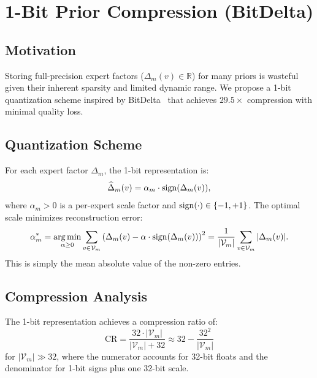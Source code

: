 \section{1-Bit Prior Compression (BitDelta)}

\label{sec:bitdelta}

\subsection{Motivation}

Storing full-precision expert factors ($\Delta_m(v) \in \mathbb{R}$) for many
priors is wasteful given their inherent sparsity and limited dynamic range. We
propose a 1-bit quantization scheme inspired by
BitDelta~\cite{liu2024bitdelta} that achieves $29.5\times$ compression with
minimal quality loss.

\subsection{Quantization Scheme}

For each expert factor $\Delta_m$, the 1-bit representation is:
\begin{equation}
    \widehat{\Delta}_m(v) = \alpha_m \cdot \operatorname{sign}(\Delta_m(v)),
    \label{eq:1bit}
\end{equation}
where $\alpha_m > 0$ is a per-expert scale factor and $\operatorname{sign}(\cdot) \in \{-1, +1\}$.
The optimal scale minimizes reconstruction error:
\begin{equation}
    \alpha_m^* = \operatorname*{arg\,min}_{\alpha \geq 0} \sum_{v \in \mathcal{V}_m}
    \left(\Delta_m(v) - \alpha \cdot \operatorname{sign}(\Delta_m(v))\right)^2
    = \frac{1}{|\mathcal{V}_m|} \sum_{v \in \mathcal{V}_m} |\Delta_m(v)|.
\end{equation}
This is simply the mean absolute value of the non-zero entries.

\subsection{Compression Analysis}

\begin{proposition}
The 1-bit representation achieves a compression ratio of:
\begin{equation}
    \text{CR} = \frac{32 \cdot |\mathcal{V}_m|}{|\mathcal{V}_m| + 32} \approx 32 - \frac{32^2}{|\mathcal{V}_m|}
\end{equation}
for $|\mathcal{V}_m| \gg 32$, where the numerator accounts for 32-bit floats
and the denominator for 1-bit signs plus one 32-bit scale.
\end{proposition}

